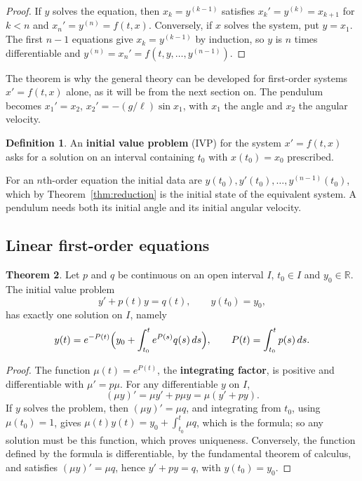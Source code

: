 \documentclass[11pt,a4paper]{article}
\numberwithin{equation}{section}
\theoremstyle{definition}
\newtheorem{thm}{Theorem}[subsection]
\newtheorem{defn}[thm]{Definition}
\begin{document}
\begin{proof}
If $y$ solves the equation, then $x_k = y^{(k-1)}$ satisfies $x_k' = y^{(k)} = x_{k+1}$ for $k < n$ and $x_n' = y^{(n)} = f(t, x)$. Conversely, if $x$ solves the system, put $y = x_1$. The first
$n - 1$ equations give $x_k = y^{(k-1)}$ by induction, so $y$ is $n$ times differentiable and $y^{(n)} = x_n' = f(t, y, \dots, y^{(n-1)})$.
\end{proof}

The theorem is why the general theory can be developed for first-order systems $x' = f(t, x)$ alone, as it will be from the next section on. The pendulum
becomes $x_1' = x_2$, $x_2' = -(g/\ell)\sin x_1$, with $x_1$ the angle and $x_2$ the angular velocity.

\begin{defn}
An \textbf{initial value problem} (IVP) for the system $x' = f(t, x)$ asks for a solution on an interval containing $t_0$ with $x(t_0) = x_0$ prescribed.
\end{defn}

For an $n$th-order equation the initial data are $y(t_0), y'(t_0), \dots, y^{(n-1)}(t_0)$, which by Theorem~\ref{thm:reduction} is the initial state of the equivalent system. A
pendulum needs both its initial angle and its initial angular velocity.

\subsection{Linear first-order equations}
\label{ssec:linear1}

\begin{thm}
\label{thm:linear1}
Let $p$ and $q$ be continuous on an open interval $I$, $t_0 \in I$ and $y_0 \in \mathbb R$. The initial value problem
\[
y' + p(t)y = q(t), \qquad y(t_0) = y_0,
\]
has exactly one solution on $I$, namely
\[
y(t) = e^{-P(t)}\Bigl(y_0 + \int_{t_0}^te^{P(s)}q(s)\,ds\Bigr), \qquad P(t) = \int_{t_0}^tp(s)\,ds .
\]
\end{thm}

\begin{proof}
The function $\mu(t) = e^{P(t)}$, the \textbf{integrating factor}, is positive and differentiable with $\mu' = p\mu$. For any differentiable $y$ on $I$,
\[
(\mu y)' = \mu y' + p\mu y = \mu(y' + py) .
\]
If $y$ solves the problem, then $(\mu y)' = \mu q$, and integrating from $t_0$, using $\mu(t_0) = 1$, gives $\mu(t)y(t) = y_0 + \int_{t_0}^t\mu q$, which is the formula; so any solution must be this
function, which proves uniqueness. Conversely, the function defined by the formula is differentiable, by the fundamental theorem of calculus, and
satisfies $(\mu y)' = \mu q$, hence $y' + py = q$, with $y(t_0) = y_0$.
\end{proof}
\end{document}
